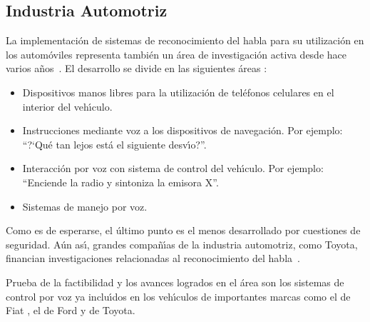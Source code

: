 \subsection{Industria Automotriz}
\label{sec:automotriz}

La implementaci\'on de sistemas de reconocimiento del habla para su utilizaci\'on en los autom\'oviles representa
tambi\'en un \'area de investigaci\'on activa desde hace varios \mbox{a\~nos \cite{HanaiS94, HuaSpeech2010}}. 
El desarrollo se divide en las siguientes \'areas \cite{Kirriemuir2003Speech}:

\begin{itemize}
	\item Dispositivos manos libres para la utilizaci\'on de tel\'efonos celulares en el interior del veh{\'\i}culo.
	\item Instrucciones mediante voz a los dispositivos de navegaci\'on. Por ejemplo: ``{?`}Qu\'e tan lejos est\'a el siguiente desv{\'\i}o?''.
	\item Interacci\'on por voz con sistema de control del veh{\'\i}culo. Por ejemplo: ``Enciende la radio y sintoniza la emisora X''.
	\item Sistemas de manejo por voz.
\end{itemize}

Como es de esperarse, el \'ultimo punto es el menos desarrollado por cuestiones de seguridad. A\'un as{\'\i}, grandes compa\~n{\'\i}as
de la industria automotriz, como Toyota, financian investigaciones relacionadas al reconocimiento del \mbox{habla \cite{HoshinoSpeech2004}}.

Prueba de la factibilidad y los avances logrados en el \'area son los sistemas de control por voz ya inclu{\'\i}dos en los
veh{\'\i}culos de importantes marcas como el  de Fiat \cite{FiatBlue}, el  de Ford \cite{FordSync}
y  \cite{ToyotaEntune} de Toyota.
